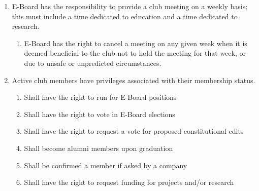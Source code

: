 

\begin{enumerate}
	\item E-Board has the responsibility to provide a club meeting on a weekly basis;
	      this must include a time dedicated to education and a time dedicated to
	      research.
	      \begin{enumerate}
		      \item E-Board has the right to cancel a meeting on any given week when it is deemed
		            beneficial to the club not to hold the meeting for that week, or due to unsafe
		            or unpredicted circumstances.
	      \end{enumerate}
	\item Active club members have privileges associated with their membership status.
	      \begin{enumerate}
		      \item Shall have the right to run for E-Board positions
		      \item Shall have the right to vote in E-Board elections
		      \item Shall have the right to request a vote for proposed constitutional edits
		      \item Shall become alumni members upon graduation
		      \item Shall be confirmed a member if asked by a company
		      \item Shall have the right to request funding for projects and/or research
	      \end{enumerate}
\end{enumerate}